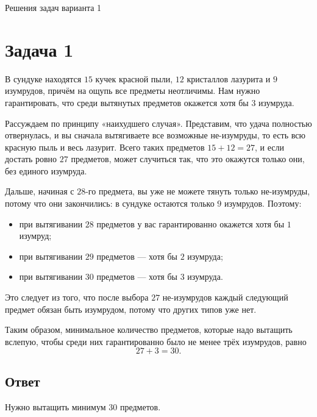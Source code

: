 \documentclass[12pt,a4paper]{article}
\begin{document}
\begin{center}
    {\Large Решения задач варианта 1}\\[1em]
\end{center}


\section*{Задача 1}

В сундуке находятся $15$ кучек красной пыли, $12$ кристаллов лазурита и $9$ изумрудов, причём на ощупь все предметы неотличимы. Нам нужно гарантировать, что среди вытянутых предметов окажется хотя бы $3$ изумруда.

Рассуждаем по принципу «наихудшего случая». Представим, что удача полностью отвернулась, и вы сначала вытягиваете все возможные не-изумруды, то есть всю красную пыль и весь лазурит. Всего таких предметов $15 + 12 = 27$, и если достать ровно $27$ предметов, может случиться так, что это окажутся только они, без единого изумруда.

Дальше, начиная с $28$-го предмета, вы уже не можете тянуть только не-изумруды, потому что они закончились: в сундуке остаются только $9$ изумрудов. Поэтому:
\begin{itemize}
  \item при вытягивании $28$ предметов у вас гарантированно окажется хотя бы $1$ изумруд;
  \item при вытягивании $29$ предметов --- хотя бы $2$ изумруда;
  \item при вытягивании $30$ предметов --- хотя бы $3$ изумруда.
\end{itemize}
Это следует из того, что после выбора $27$ не-изумрудов каждый следующий предмет обязан быть изумрудом, потому что других типов уже нет.

Таким образом, минимальное количество предметов, которые надо вытащить вслепую, чтобы среди них гарантированно было не менее трёх изумрудов, равно
\[
27 + 3 = 30.
\]

\subsection*{Ответ}
Нужно вытащить минимум $30$ предметов.

\newpage
\end{document}
